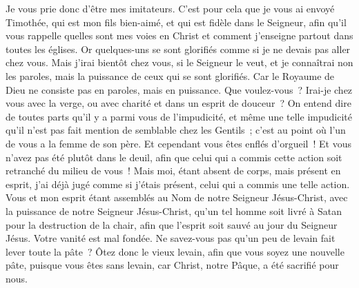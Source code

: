 \begin{multicols}{2}
Je vous prie donc d'être mes imitateurs.
C'est pour cela que je vous ai envoyé Timothée, qui est mon fils bien-aimé, et qui est fidèle dans le Seigneur, afin qu'il vous rappelle quelles sont mes voies en Christ et comment j'enseigne partout dans toutes les églises.
Or quelques-uns se sont glorifiés comme si je ne devais pas aller chez vous.
Mais j'irai bientôt chez vous, si le Seigneur le veut, et je connaîtrai non les paroles, mais la puissance de ceux qui se sont glorifiés.
Car le Royaume de Dieu ne consiste pas en paroles, mais en puissance.
Que voulez-vous~? Irai-je chez vous avec la verge, ou avec charité et dans un esprit de douceur~?
\VerseOne{}On entend dire de toutes parts qu'il y a parmi vous de l'impudicité, et même une telle impudicité qu'il n'est pas fait mention de semblable chez les Gentils~; c'est au point où l'un de vous a la femme de son père.
Et cependant vous êtes enflés d'orgueil~! Et vous n'avez pas été plutôt dans le deuil, afin que celui qui a commis cette action soit retranché du milieu de vous~!
Mais moi, étant absent de corps, mais présent en esprit, j'ai déjà jugé comme si j'étais présent, celui qui a commis une telle action.
Vous et mon esprit étant assemblés au Nom de notre Seigneur Jésus-Christ, avec la puissance de notre Seigneur Jésus-Christ,
qu'un tel homme soit livré à Satan pour la destruction de la chair, afin que l'esprit soit sauvé au jour du Seigneur Jésus.
Votre vanité est mal fondée. Ne savez-vous pas qu'un peu de levain fait lever toute la pâte~?
Ôtez donc le vieux levain, afin que vous soyez une nouvelle pâte, puisque vous êtes sans levain, car Christ, notre Pâque, a été sacrifié pour nous.

\end{multicols}
